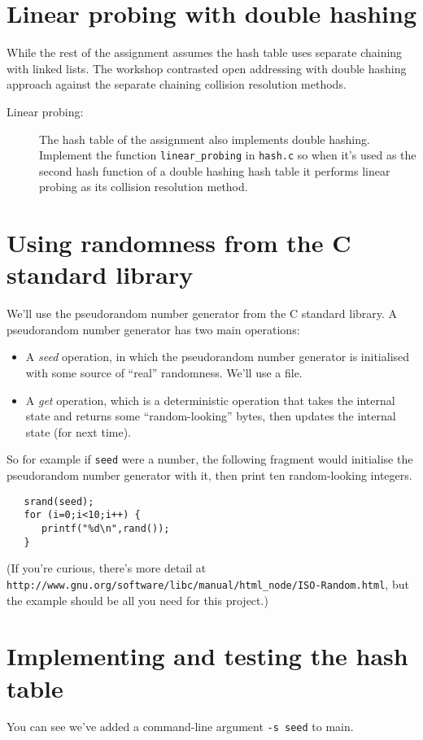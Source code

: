 \documentclass[11pt]{article}
\begin{document}
\section*{Linear probing with double hashing}
While the rest of the assignment assumes the hash table uses separate
chaining with linked lists. The workshop contrasted open addressing with
double hashing approach against the separate chaining collision resolution
methods.

\begin{description}
    \item[Linear probing:]
        The hash table of the assignment also implements double hashing.
        Implement the function {\tt linear\_probing} in {\tt hash.c}
        so when it's used as the second hash function of a double
        hashing hash table it performs linear probing as its collision
        resolution method.
\end{description}

\section*{Using randomness from the C standard library}
We'll use the pseudorandom number generator from the C standard library.  A
pseudorandom number generator has two main operations:
\begin{itemize}
\item A \emph{seed} operation, in which the pseudorandom number generator is
    initialised with some source of ``real'' randomness.  We'll use a file.
\item A \emph{get} operation, which is a deterministic operation that takes the
    internal state and returns some ``random-looking'' bytes, then updates the
        internal state (for next time).
\end{itemize}
So for example if {\tt seed} were a number, the following fragment would
initialise the pseudorandom number generator with it, then print ten
random-looking integers.

\begin{verbatim}
   srand(seed);
   for (i=0;i<10;i++) {
      printf("%d\n",rand());
   }
\end{verbatim}

(If you're curious, there's more detail at
{\tt http://www.gnu.org/software/libc/manual/html\_node/ISO-Random.html},
but the example should be all you need for this project.)

\section*{Implementing and testing the hash table} You can see we've added a
command-line argument {\tt -s seed} to main.
\end{document}
